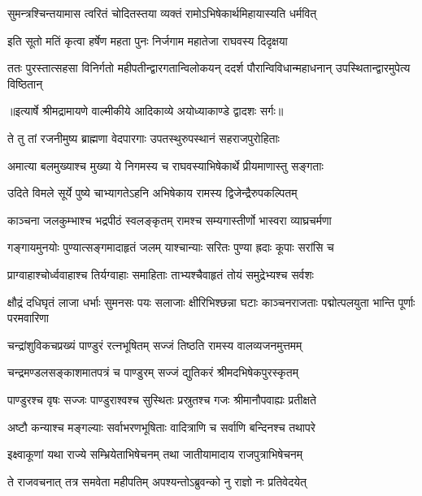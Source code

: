 \twolineshloka
{सुमन्त्रश्चिन्तयामास त्वरितं चोदितस्तया}
{व्यक्तं रामोऽभिषेकार्थमिहायास्यति धर्मवित्} %

\twolineshloka
{इति सूतो मतिं कृत्वा हर्षेण महता पुनः}
{निर्जगाम महातेजा राघवस्य दिदृक्षया} %

\fourlineindentedshloka
{ततः पुरस्तात्सहसा विनिर्गतो}
{महीपतीन्द्वारगतान्विलोकयन्}
{ददर्श पौरान्विविधान्महाधनान्}
{उपस्थितान्द्वारमुपेत्य विष्ठितान्} %


{॥इत्यार्षे श्रीमद्रामायणे वाल्मीकीये आदिकाव्ये अयोध्याकाण्डे द्वादशः सर्गः॥}


\twolineshloka
{ते तु तां रजनीमुष्य ब्राह्मणा वेदपारगाः}
{उपतस्थुरुपस्थानं सहराजपुरोहिताः} %

\twolineshloka
{अमात्या बलमुख्याश्च मुख्या ये निगमस्य च}
{राघवस्याभिषेकार्थे प्रीयमाणास्तु सङ्गताः} %

\twolineshloka
{उदिते विमले सूर्ये पुष्ये चाभ्यागतेऽहनि}
{अभिषेकाय रामस्य द्विजेन्द्रैरुपकल्पितम्} %

\twolineshloka
{काञ्चना जलकुम्भाश्च भद्रपीठं स्वलङ्कृतम्}
{रामश्च सम्यगास्तीर्णो भास्वरा व्याघ्रचर्मणा} %

\twolineshloka
{गङ्गायमुनयोः पुण्यात्सङ्गमादाहृतं जलम्}
{याश्चान्याः सरितः पुण्या ह्रदाः कूपाः सरांसि च} %

\twolineshloka
{प्राग्वाहाश्चोर्ध्ववाहाश्च तिर्यग्वाहाः समाहिताः}
{ताभ्यश्चैवाहृतं तोयं समुद्रेभ्यश्च सर्वशः} %

\threelineshloka
{क्षौद्रं दधिघृतं लाजा धर्भाः सुमनसः पयः}
{सलाजाः क्षीरिभिश्छन्ना घटाः काञ्चनराजताः}
{पद्मोत्पलयुता भान्ति पूर्णाः परमवारिणा} %

\twolineshloka
{चन्द्रांशुविकचप्रख्यं पाण्डुरं रत्नभूषितम्}
{सज्जं तिष्ठति रामस्य वालव्यजनमुत्तमम्} %

\twolineshloka
{चन्द्रमण्डलसङ्काशमातपत्रं च पाण्डुरम्}
{सज्जं द्युतिकरं श्रीमदभिषेकपुरस्कृतम्} %

\twolineshloka
{पाण्डुरश्च वृषः सज्जः पाण्डुराश्वश्च सुस्थितः}
{प्रस्रुतश्च गजः श्रीमानौपवाह्यः प्रतीक्षते} %

\twolineshloka
{अष्टौ कन्याश्च मङ्गल्याः सर्वाभरणभूषिताः}
{वादित्राणि च सर्वाणि बन्दिनश्च तथापरे} %

\twolineshloka
{इक्ष्वाकूणां यथा राज्ये सम्भ्रियेताभिषेचनम्}
{तथा जातीयामादाय राजपुत्राभिषेचनम्} %

\twolineshloka
{ते राजवचनात् तत्र समवेता महीपतिम्}
{अपश्यन्तोऽब्रुवन्को नु राज्ञो नः प्रतिवेदयेत्} %

